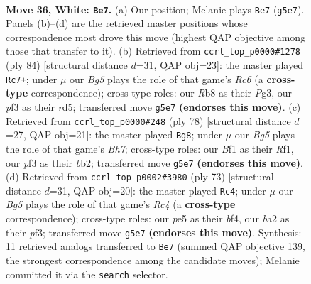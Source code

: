 \documentclass[11pt]{article}
\begin{document}
\clearpage

\begin{figure}[p]\centering
\begin{subfigure}{0.46\textwidth}\centering
\resizebox{\linewidth}{!}{%
\newchessgame
\chessboard[
  setfen={1R6/6k1/8/4p1B1/4r2p/5p1P/b4P2/5BK1 w - - 0 36},
  showmover=false,
  pgfstyle=straightmove, color=movearrow, markmove={g5-e7}
]}
\caption{}
\end{subfigure}\hfill
\begin{subfigure}{0.46\textwidth}\centering
\resizebox{\linewidth}{!}{%
\newchessgame
\chessboard[
  setfen={8/5k2/2R2b2/3r1p1p/8/2p1B1PP/4KP2/8 w - - 12 43},
  showmover=false,
  pgfstyle=straightmove, color=movearrow, markmove={c6-c7}
]}
\caption{}
\end{subfigure}
\\[4pt]
\begin{subfigure}{0.46\textwidth}\centering
\resizebox{\linewidth}{!}{%
\newchessgame
\chessboard[
  setfen={8/ppk4B/4r1p1/1P4P1/6K1/6P1/1b6/5R2 w - - 1 40},
  showmover=false,
  pgfstyle=straightmove, color=movearrow, markmove={h7-g8}
]}
\caption{}
\end{subfigure}\hfill
\begin{subfigure}{0.46\textwidth}\centering
\resizebox{\linewidth}{!}{%
\newchessgame
\chessboard[
  setfen={6k1/6p1/5p2/2rP1b1p/5B1P/5P2/6P1/3R2K1 b - - 3 37},
  showmover=false,
  pgfstyle=straightmove, color=movearrow, markmove={c5-c4}
]}
\caption{}
\end{subfigure}
\caption{\textbf{Move 36, White: \texttt{Be7}.} (a) Our position; Melanie plays \texttt{Be7} (\texttt{g5e7}). Panels (b)--(d) are the retrieved master positions whose correspondence most drove this move (highest QAP objective among those that transfer to it). (b) Retrieved from \texttt{ccrl\_top\_p0000\#1278} (ply 84) [structural distance $d$=31, QAP obj=23]: the master played \texttt{Rc7+}; under $\mu$ our \emph{Bg5} plays the role of that game's \emph{Rc6} (a \textbf{cross-type} correspondence); cross-type roles: our \emph{R}b8 as their \emph{P}g3, our \emph{p}f3 as their \emph{r}d5; transferred move \texttt{g5e7} \textbf{(endorses this move)}. (c) Retrieved from \texttt{ccrl\_top\_p0000\#248} (ply 78) [structural distance $d$=27, QAP obj=21]: the master played \texttt{Bg8}; under $\mu$ our \emph{Bg5} plays the role of that game's \emph{Bh7}; cross-type roles: our \emph{B}f1 as their \emph{R}f1, our \emph{p}f3 as their \emph{b}b2; transferred move \texttt{g5e7} \textbf{(endorses this move)}. (d) Retrieved from \texttt{ccrl\_top\_p0002\#3980} (ply 73) [structural distance $d$=31, QAP obj=20]: the master played \texttt{Rc4}; under $\mu$ our \emph{Bg5} plays the role of that game's \emph{Rc4} (a \textbf{cross-type} correspondence); cross-type roles: our \emph{p}e5 as their \emph{b}f4, our \emph{b}a2 as their \emph{p}f3; transferred move \texttt{g5e7} \textbf{(endorses this move)}. Synthesis: 11 retrieved analogs transferred to \texttt{Be7} (summed QAP objective 139, the strongest correspondence among the candidate moves); Melanie committed it via the \texttt{search} selector.}
\label{fig:thought-m70}
\end{figure}
\end{document}
